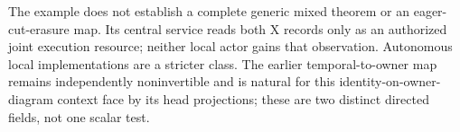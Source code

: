\documentclass{article}\usepackage{amsmath,amssymb,amsthm}
\begin{document}
The example does not establish a complete generic mixed theorem or an eager-cut-erasure map. Its central service reads both X records only as an authorized joint execution resource; neither local actor gains that observation. Autonomous local implementations are a stricter class. The earlier temporal-to-owner map remains independently noninvertible and is natural for this identity-on-owner-diagram context face by its head projections; these are two distinct directed fields, not one scalar test.
\end{document}

